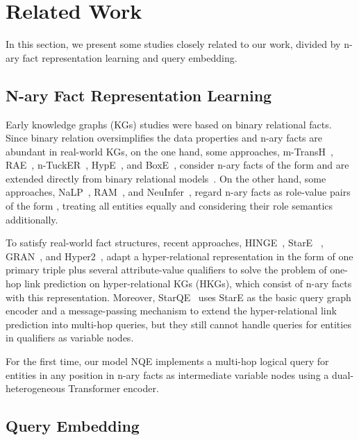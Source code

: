 \documentclass[letterpaper]{article} \usepackage{aaai23}  \usepackage{times}  \usepackage{helvet}  \usepackage{courier}  \usepackage[hyphens]{url}  \usepackage{graphicx} \urlstyle{rm} \def\UrlFont{\rm}  \usepackage{natbib}  \usepackage{caption} \frenchspacing  \setlength{\pdfpagewidth}{8.5in}  \setlength{\pdfpageheight}{11in}  \usepackage{algorithm}
\begin{document}
\section{Related Work}
In this section, we present some studies closely related to our work, divided by n-ary fact representation learning and query embedding.
\subsection{N-ary Fact Representation Learning} 
Early knowledge graphs (KGs) studies were based on binary relational facts. Since binary relation oversimplifies the data properties and n-ary facts are abundant in real-world KGs, on the one hand, some approaches, m-TransH~\citep{m-TransH}, RAE~\citep{RAE}, n-TuckER~\citep{n-TuckER}, HypE~\citep{HypE}, and BoxE~\citep{BoxE}, consider n-ary facts of the form  and are extended directly from binary relational models~\citep{TransH, TuckER, SimplE}. On the other hand, some approaches, NaLP~\citep{NaLP}, RAM~\citep{RAM}, and NeuInfer~\citep{NeuInfer}, regard n-ary facts as role-value pairs of the form , treating all entities equally and considering their role semantics additionally. 

To satisfy real-world fact structures, recent approaches, HINGE~\citep{HINGE}, StarE ~\citep{StarE}, GRAN~\citep{GRAN}, and Hyper2~\citep{Hyper2}, adapt a hyper-relational representation in the form of one primary triple plus several attribute-value qualifiers  to solve the problem of one-hop link prediction on hyper-relational KGs (HKGs), which consist of n-ary facts with this representation. Moreover, StarQE~\citep{StarQE} uses StarE as the basic query graph encoder and a message-passing mechanism to extend the hyper-relational link prediction into multi-hop queries, but they still cannot handle queries for entities in qualifiers as variable nodes. 

For the first time, our model NQE implements a multi-hop logical query for entities in any position in n-ary facts as intermediate variable nodes using a dual-heterogeneous Transformer encoder.


\subsection{Query Embedding}
\end{document}
